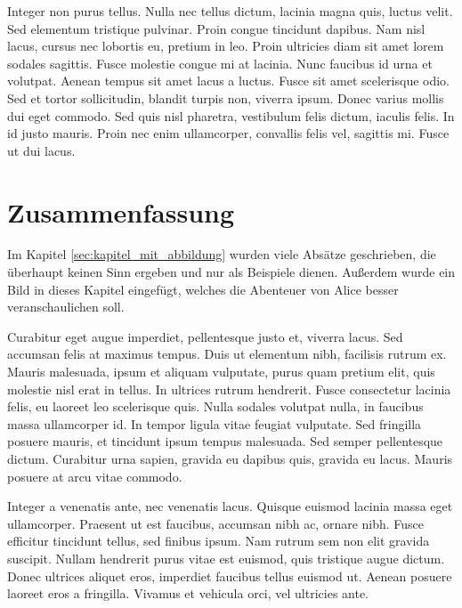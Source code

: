 \documentclass[12pt, a4paper]{article}
\begin{document}
Integer non purus tellus. Nulla nec tellus dictum, lacinia magna quis, luctus velit. Sed elementum tristique pulvinar. Proin congue tincidunt dapibus. Nam nisl lacus, cursus nec lobortis eu, pretium in leo. Proin ultricies diam sit amet lorem sodales sagittis. Fusce molestie congue mi at lacinia. Nunc faucibus id urna et volutpat. Aenean tempus sit amet lacus a luctus. Fusce sit amet scelerisque odio. Sed et tortor sollicitudin, blandit turpis non, viverra ipsum. Donec varius mollis dui eget commodo. Sed quis nisl pharetra, vestibulum felis dictum, iaculis felis. In id justo mauris. Proin nec enim ullamcorper, convallis felis vel, sagittis mi. Fusce ut dui lacus.

\section{Zusammenfassung}

Im Kapitel \ref{sec:kapitel_mit_abbildung} wurden viele Absätze geschrieben, die überhaupt keinen Sinn ergeben und nur als Beispiele dienen. Außerdem wurde ein Bild in dieses Kapitel eingefügt, welches die Abenteuer von Alice besser veranschaulichen soll.

Curabitur eget augue imperdiet, pellentesque justo et, viverra lacus. Sed accumsan felis at maximus tempus. Duis ut elementum nibh, facilisis rutrum ex. Mauris malesuada, ipsum et aliquam vulputate, purus quam pretium elit, quis molestie nisl erat in tellus. In ultrices rutrum hendrerit. Fusce consectetur lacinia felis, eu laoreet leo scelerisque quis. Nulla sodales volutpat nulla, in faucibus massa ullamcorper id. In tempor ligula vitae feugiat vulputate. Sed fringilla posuere mauris, et tincidunt ipsum tempus malesuada. Sed semper pellentesque dictum. Curabitur urna sapien, gravida eu dapibus quis, gravida eu lacus. Mauris posuere at arcu vitae commodo.

Integer a venenatis ante, nec venenatis lacus. Quisque euismod lacinia massa eget ullamcorper. Praesent ut est faucibus, accumsan nibh ac, ornare nibh. Fusce efficitur tincidunt tellus, sed finibus ipsum. Nam rutrum sem non elit gravida suscipit. Nullam hendrerit purus vitae est euismod, quis tristique augue dictum. Donec ultrices aliquet eros, imperdiet faucibus tellus euismod ut. Aenean posuere laoreet eros a fringilla. Vivamus et vehicula orci, vel ultricies ante.

\clearpage
\printbibliography[heading=bibintoc]

\clearpage
\listoffigures
{}
\end{document}

